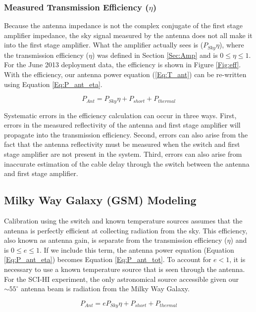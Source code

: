 \subsubsection{Measured Transmission Efficiency ($\eta$)}

Because the antenna impedance is not the complex conjugate of the first stage amplifier impedance, the sky signal measured by the antenna does not all make it into the first stage amplifier. What the amplifier actually sees is ($P_{Sky}\eta$), where the transmission efficiency ($\eta$) was defined in Section \ref{Sec:Amp} and is $0 \leq \eta \leq 1$. For the June 2013 deployment data, the efficiency is shown in Figure \ref{Fig:eff}. With the efficiency, our antenna power equation (\ref{Eq:T_ant}) can be re-written using Equation \ref{Eq:P_ant_eta}.

\begin{equation}\label{Eq:P_ant_eta}
P_{Ant} = P_{Sky} \eta  + P_{short} +P_{thermal}
\end{equation}

Systematic errors in the efficiency calculation can occur in three ways. First, errors in the measured reflectivity of the antenna and first stage amplifier will propagate into the transmission efficiency. Second, errors can also arise from the fact that the antenna reflectivity must be measured when the switch and first stage amplifier are not present in the system. Third, errors can also arise from inaccurate estimation of the cable delay through the switch between the antenna and first stage amplifier. 

\subsection{Milky Way Galaxy (GSM) Modeling} \label{Sec:model}

Calibration using the switch and known temperature sources assumes that the antenna is perfectly efficient at collecting radiation from the sky. This efficiency, also known as antenna gain, is separate from the transmission efficiency ($\eta$) and is $0 \leq e \leq 1$. If we include this term, the antenna power equation (Equation \ref{Eq:P_ant_eta}) becomes Equation \ref{Eq:P_ant_tot}. To account for $e<1$, it is necessary to use a known temperature source that is seen through the antenna. For the SCI-HI experiment, the only astronomical source accessible given our $\sim 55 ^\circ$ antenna beam is radiation from the Milky Way Galaxy. 

\begin{equation}\label{Eq:P_ant_tot}
P_{Ant} = e P_{Sky} \eta + P_{short} + P_{thermal}
\end{equation}



